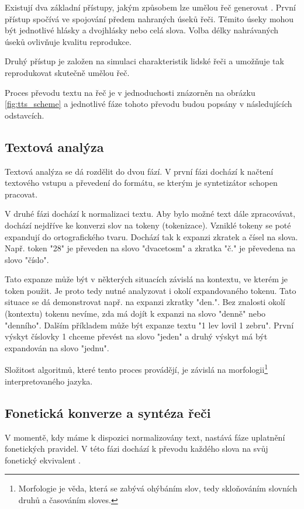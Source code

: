 \documentclass[ing,male,java,dept460,twoside]{diploma}						%
\begin{document}
Existují dva základní přístupy, jakým způsobem lze umělou řeč generovat \cite{tts_wiki}. První přístup spočívá ve spojování předem nahraných úseků řeči. Těmito úseky mohou být jednotlivé hlásky a dvojhlásky nebo celá slova. Volba délky nahrávaných úseků ovlivňuje kvalitu reprodukce.

Druhý přístup je založen na simulaci charakteristik lidské řeči a umožňuje tak reprodukovat skutečně umělou řeč.

Proces převodu textu na řeč je v jednoduchosti znázorněn na obrázku \ref{fig:tts_scheme} a jednotlivé fáze tohoto převodu budou popsány v následujících odstavcích.


\subsection{Textová analýza}
Textová analýza se dá rozdělit do dvou fází. V první fázi dochází k načtení textového vstupu a převedení do formátu, se kterým je syntetizátor schopen pracovat.

V druhé fázi dochází k normalizaci textu. Aby bylo možné text dále zpracovávat, dochází nejdříve ke konverzi slov na tokeny (tokenizace). Vzniklé tokeny se poté expandují do ortografického tvaru. Dochází tak k expanzi zkratek a čísel na slova. Např. token "28" je převeden na slovo "dvacetosm" a zkratka "č." je převedena na slovo "číslo".

Tato expanze může být v některých situacích závislá na kontextu, ve kterém je token použit. Je proto tedy nutné analyzovat i okolí expandovaného tokenu. Tato situace se dá demonstrovat např. na expanzi zkratky "den.". Bez znalosti okolí (kontextu) tokenu nevíme, zda má dojít k expanzi na slovo "denně" nebo "denního". Dalším příkladem může být expanze textu "1 lev lovil 1 zebru". První výskyt číslovky 1 chceme převést na slovo "jeden" a druhý výskyt má být expandován na slovo "jednu".

Složitost algoritmů, které tento proces provádějí, je závislá na morfologii\footnote{Morfologie je věda, která se zabývá ohýbáním slov, tedy skloňováním slovních druhů a časováním sloves.} interpretovaného jazyka.

\subsection{Fonetická konverze a syntéza řeči}
V momentě, kdy máme k dispozici normalizovány text, nastává fáze uplatnění fonetických pravidel. V této fázi dochází k převodu každého slova na svůj fonetický ekvivalent \cite{tts_linguatec}.
\end{document}
